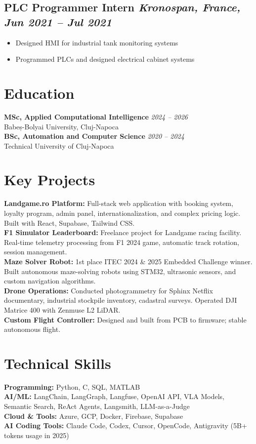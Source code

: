 \documentclass[11pt,a4paper]{article}
\begin{document}
\subsection*{PLC Programmer Intern \hfill \textit{Kronospan, France, Jun 2021 -- Jul 2021}}
\begin{itemize}
    \item Designed HMI for industrial tank monitoring systems
    \item Programmed PLCs and designed electrical cabinet systems
\end{itemize}

\section*{Education}
\textbf{MSc, Applied Computational Intelligence} \hfill \textit{2024 -- 2026} \\
Babeș-Bolyai University, Cluj-Napoca \\[0.3em]
\textbf{BSc, Automation and Computer Science} \hfill \textit{2020 -- 2024} \\
Technical University of Cluj-Napoca

\section*{Key Projects}
\textbf{Landgame.ro Platform:} Full-stack web application with booking system, loyalty program, admin panel, internationalization, and complex pricing logic. Built with React, Supabase, Tailwind CSS. \\[0.3em]
\textbf{F1 Simulator Leaderboard:} Freelance project for Landgame racing facility. Real-time telemetry processing from F1 2024 game, automatic track rotation, session management. \\[0.3em]
\textbf{Maze Solver Robot:} 1st place ITEC 2024 \& 2025 Embedded Challenge winner. Built autonomous maze-solving robots using STM32, ultrasonic sensors, and custom navigation algorithms. \\[0.3em]
\textbf{Drone Operations:} Conducted photogrammetry for Sphinx Netflix documentary, industrial stockpile inventory, cadastral surveys. Operated DJI Matrice 400 with Zenmuse L2 LiDAR. \\[0.3em]
\textbf{Custom Flight Controller:} Designed and built from PCB to firmware; stable autonomous flight.

\section*{Technical Skills}
\textbf{Programming:} Python, C, SQL, MATLAB \\[0.3em]
\textbf{AI/ML:} LangChain, LangGraph, Langfuse, OpenAI API, VLA Models, Semantic Search, ReAct Agents, Langsmith, LLM-as-a-Judge \\[0.3em]
\textbf{Cloud \& Tools:} Azure, GCP, Docker, Firebase, Supabase \\[0.3em]
\textbf{AI Coding Tools:} Claude Code, Codex, Cursor, OpenCode, Antigravity (5B+ tokens usage in 2025)
\end{document}
